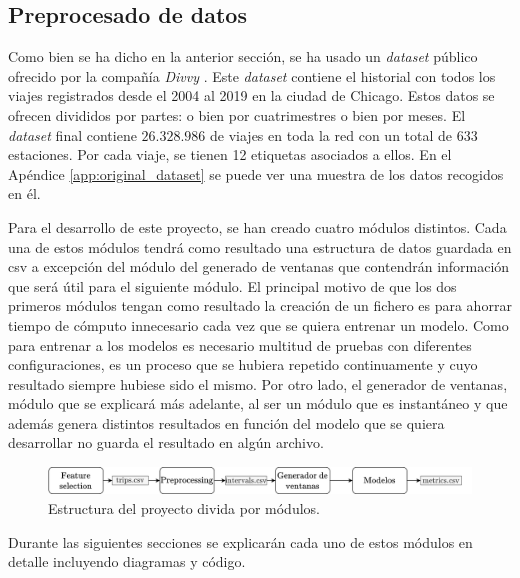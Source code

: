 \subsection{Preprocesado de datos}

Como bien se ha dicho en la anterior sección, se ha usado un \textit{dataset} público ofrecido por la compañía \textit{Divvy} \cite{divvy}. Este \textit{dataset} contiene el historial con todos los viajes registrados desde el 2004 al 2019 en la ciudad de Chicago. Estos datos se ofrecen divididos por partes: o bien por cuatrimestres o bien por meses. El \textit{dataset} final contiene $26.328.986$ de viajes en toda la red con un total de $633$ estaciones. Por cada viaje, se tienen 12 etiquetas asociados a ellos. En el Apéndice \ref{app:original_dataset} se puede ver una muestra de los datos recogidos en él.
\newline

Para el desarrollo de este proyecto, se han creado cuatro módulos distintos. Cada una de estos módulos tendrá como resultado una estructura de datos guardada en \acrshort{csv} a excepción del módulo del generado de ventanas que contendrán información que será útil para el siguiente módulo. El principal motivo de que los dos primeros módulos tengan como resultado la creación de un fichero es para ahorrar tiempo de cómputo innecesario cada vez que se quiera entrenar un modelo. Como para entrenar a los modelos es necesario multitud de pruebas con diferentes configuraciones, es un proceso que se hubiera repetido continuamente y cuyo resultado siempre hubiese sido el mismo. Por otro lado, el generador de ventanas, módulo que se explicará más adelante, al ser un módulo que es instantáneo y que además genera distintos resultados en función del modelo que se quiera desarrollar no guarda el resultado en algún archivo.


\begin{figure}[H]
    \centering
    \includegraphics[width=15cm]{images/solution/modules/modules.png}
    \caption{Estructura del proyecto divida por módulos.}
\end{figure}

Durante las siguientes secciones se explicarán cada uno de estos módulos en detalle incluyendo diagramas y código.




